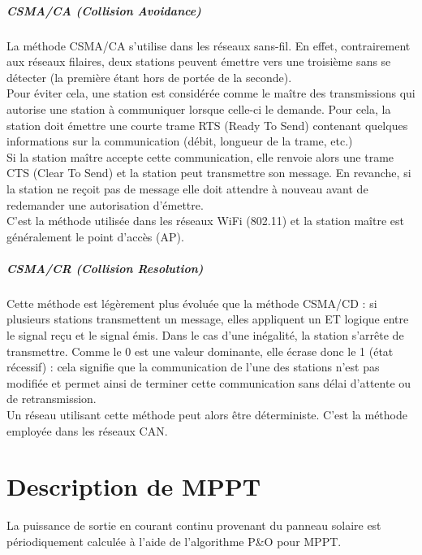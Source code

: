 \documentclass[11pt, a4paper, twoside]{book}
\begin{document}
\paragraph{CSMA/CA (Collision Avoidance)}
La méthode CSMA/CA s'utilise dans les réseaux sans-fil. En effet, contrairement aux réseaux filaires, deux stations peuvent émettre vers une troisième sans se détecter (la première étant hors de portée de la seconde).\\

Pour éviter cela, une station est considérée comme le maître des transmissions qui autorise une station à communiquer lorsque celle-ci le demande. Pour cela, la station doit émettre une courte trame RTS (Ready To Send) contenant quelques informations sur la communication (débit, longueur de la trame, etc.)\\

Si la station maître accepte cette communication, elle renvoie alors une trame CTS (Clear To Send) et la station peut transmettre son message. En revanche, si la station ne reçoit pas de message elle doit attendre à nouveau avant de redemander une autorisation d'émettre.\\

C'est la méthode utilisée dans les réseaux WiFi (802.11) et la station maître est généralement le point d'accès (AP).

\paragraph{CSMA/CR (Collision Resolution)}
Cette méthode est légèrement plus évoluée que la méthode CSMA/CD : si plusieurs stations transmettent un message, elles appliquent un ET logique entre le signal reçu et le signal émis. Dans le cas d'une inégalité, la station s'arrête de transmettre. Comme le 0 est une valeur dominante, elle écrase donc le 1 (état récessif) : cela signifie que la communication de l'une des stations n'est pas modifiée et permet ainsi de terminer cette communication sans délai d'attente ou de retransmission.\\

Un réseau utilisant cette méthode peut alors être déterministe. C'est la méthode employée dans les réseaux CAN.

\chapter{Description de MPPT}
\label{apdx:MPPT}
La puissance de sortie en courant continu provenant du panneau solaire est périodiquement calculée à l'aide de l'algorithme P\&O pour MPPT.\\
\end{document}
